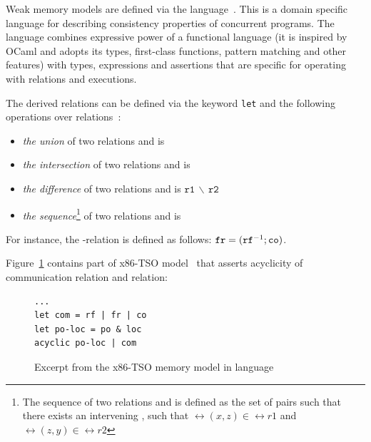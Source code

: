 Weak memory models are defined via the \cat language~\cite{alglave2016syntax}.
This is a domain specific language for describing consistency properties of concurrent programs.
The \cat language combines expressive power of a functional language (it is inspired by OCaml and adopts its types, first-class functions, pattern matching and other features) with types, expressions and assertions that are specific for operating with relations and executions.

The derived relations can be defined via the keyword \texttt{let} and the following operations over relations~\cite{alglave2016syntax}: %

\begin{itemize}
	\item \textit{the union} of two relations  and  is 
	\item \textit{the intersection} of two relations  and  is 
	\item \textit{the difference} of two relations  and  is $\mathtt{r1\,\backslash\,r2}$
	\item \textit{the sequence}\footnote{The sequence of two relations  and  is defined as the set of pairs  such that there exists an intervening , such that $\rel{(x,z)} \in \rel{r1}$ and $\rel{(z,y)} \in \rel{r2}$}
	of two relations  and  is 
\end{itemize}

For instance, the \fr-relation is defined as follows: $\mathtt{fr} = (\mathtt{rf}^{-1};\mathtt{co})$.

Figure~\ref{example:x86-cat} contains part of x86-TSO model~\cite{owens2009better} that asserts acyclicity of communication relation and  relation:

\begin{figure}[!h]
\begin{lstlisting}
...
let com = rf | fr | co
let po-loc = po & loc
acyclic po-loc | com
\end{lstlisting}
\caption{Excerpt from the x86-TSO memory model in \cat language}
\label{example:x86-cat}
\end{figure}


